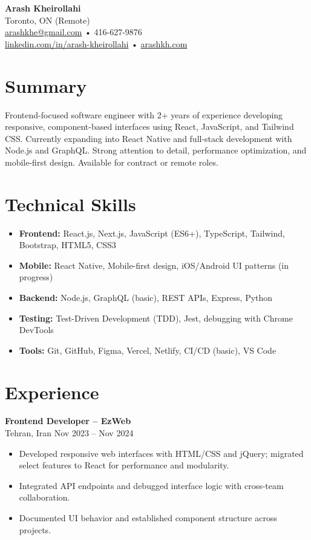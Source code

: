 \documentclass[letterpaper,11pt]{article}
\begin{document}

{\LARGE \textbf{Arash Kheirollahi}}\\[0.2em]
Toronto, ON (Remote) \\
\href{mailto:arashkhe@gmail.com}{arashkhe@gmail.com} • 416-627-9876 \\
\href{https://linkedin.com/in/arash-kheirollahi}{linkedin.com/in/arash-kheirollahi} • \href{https://arashkh.com}{arashkh.com}

\vspace{0.8em}

\section*{Summary}
Frontend-focused software engineer with 2+ years of experience developing responsive, component-based interfaces using React, JavaScript, and Tailwind CSS. Currently expanding into React Native and full-stack development with Node.js and GraphQL. Strong attention to detail, performance optimization, and mobile-first design. Available for contract or remote roles.

\section*{Technical Skills}
\begin{itemize}[leftmargin=*]
  \item \textbf{Frontend:} React.js, Next.js, JavaScript (ES6+), TypeScript, Tailwind, Bootstrap, HTML5, CSS3
  \item \textbf{Mobile:} React Native, Mobile-first design, iOS/Android UI patterns (in progress)
  \item \textbf{Backend:} Node.js, GraphQL (basic), REST APIs, Express, Python
  \item \textbf{Testing:} Test-Driven Development (TDD), Jest, debugging with Chrome DevTools
  \item \textbf{Tools:} Git, GitHub, Figma, Vercel, Netlify, CI/CD (basic), VS Code
\end{itemize}

\section*{Experience}
\textbf{Frontend Developer – EzWeb}\\
Tehran, Iran \hfill Nov 2023 -- Nov 2024
\begin{itemize}[leftmargin=*]
  \item Developed responsive web interfaces with HTML/CSS and jQuery; migrated select features to React for performance and modularity.
  \item Integrated API endpoints and debugged interface logic with cross-team collaboration.
  \item Documented UI behavior and established component structure across projects.
\end{itemize}
\end{document}
